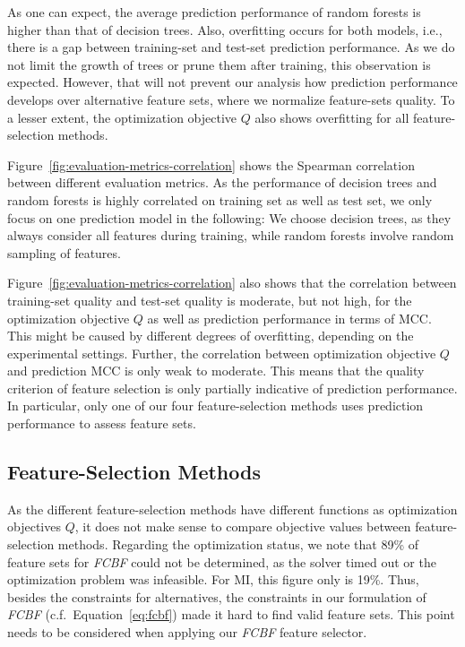 \documentclass[conference]{IEEEtran}
\theoremstyle{definition}
\begin{document}
As one can expect, the average prediction performance of random forests is higher than that of decision trees.
Also, overfitting occurs for both models, i.e., there is a gap between training-set and test-set prediction performance.
As we do not limit the growth of trees or prune them after training, this observation is expected.
However, that will not prevent our analysis how prediction performance develops over alternative feature sets, where we normalize feature-sets quality.
To a lesser extent, the optimization objective $Q$ also shows overfitting for all feature-selection methods.

Figure~\ref{fig:evaluation-metrics-correlation} shows the Spearman correlation between different evaluation metrics.
As the performance of decision trees and random forests is highly correlated on training set as well as test set, we only focus on one prediction model in the following:
We choose decision trees, as they always consider all features during training, while random forests involve random sampling of features.

Figure~\ref{fig:evaluation-metrics-correlation} also shows that the correlation between training-set quality and test-set quality is moderate, but not high, for the optimization objective $Q$ as well as prediction performance in terms of MCC.
This might be caused by different degrees of overfitting, depending on the experimental settings.
Further, the correlation between optimization objective $Q$ and prediction MCC is only weak to moderate.
This means that the quality criterion of feature selection is only partially indicative of prediction performance.
In particular, only one of our four feature-selection methods uses prediction performance to assess feature sets.

\subsection{Feature-Selection Methods}

As the different feature-selection methods have different functions as optimization objectives $Q$, it does not make sense to compare objective values between feature-selection methods.
Regarding the optimization status, we note that 89\% of feature sets for \emph{FCBF} could not be determined, as the solver timed out or the optimization problem was infeasible.
For MI, this figure only is 19\%.
Thus, besides the constraints for alternatives, the constraints in our formulation of \emph{FCBF} (c.f.~Equation~\ref{eq:fcbf}) made it hard to find valid feature sets.
This point needs to be considered when applying our \emph{FCBF} feature selector.
\end{document}
